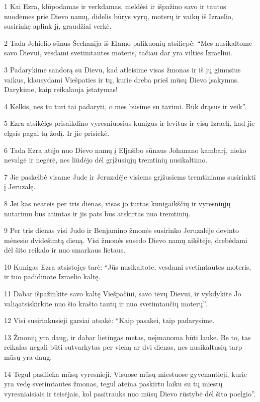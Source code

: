 \par 1 Kai Ezra, klūpodamas ir verkdamas, meldėsi ir išpažino savo ir tautos nuodėmes prie Dievo namų, didelis būrys vyrų, moterų ir vaikų iš Izraelio, susirinkę aplink jį, graudžiai verkė. 
\par 2 Tada Jehielio sūnus Šechanija iš Elamo palikuonių atsiliepė: “Mes nusikaltome savo Dievui, vesdami svetimtautes moteris, tačiau dar yra vilties Izraeliui. 
\par 3 Padarykime sandorą su Dievu, kad atleisime visas žmonas ir iš jų gimusius vaikus, klausydami Viešpaties ir tų, kurie dreba prieš mūsų Dievo įsakymus. Darykime, kaip reikalauja įstatymas! 
\par 4 Kelkis, nes tu turi tai padaryti, o mes būsime su tavimi. Būk drąsus ir veik”. 
\par 5 Ezra atsikėlęs prisaikdino vyresniuosius kunigus ir levitus ir visą Izraelį, kad jie elgsis pagal tą žodį. Ir jie prisiekė. 
\par 6 Tada Ezra atėjo nuo Dievo namų į Eljašibo sūnaus Johanano kambarį, nieko nevalgė ir negėrė, nes liūdėjo dėl grįžusiųjų tremtinių nusikaltimo. 
\par 7 Jie paskelbė visame Jude ir Jeruzalėje visiems grįžusiems tremtiniams susirinkti į Jeruzalę. 
\par 8 Jei kas neateis per tris dienas, visas jo turtas kunigaikščių ir vyresniųjų nutarimu bus atimtas ir jis pats bus atskirtas nuo tremtinių. 
\par 9 Per tris dienas visi Judo ir Benjamino žmonės susirinko Jeruzalėje devinto mėnesio dvidešimtą dieną. Visi žmonės susėdo Dievo namų aikštėje, drebėdami dėl šito reikalo ir nuo smarkaus lietaus. 
\par 10 Kunigas Ezra atsistojęs tarė: “Jūs nusikaltote, vesdami svetimtautes moteris, ir tuo padidinote Izraelio kaltę. 
\par 11 Dabar išpažinkite savo kaltę Viešpačiui, savo tėvų Dievui, ir vykdykite Jo valią­atsiskirkite nuo šio krašto tautų ir nuo svetimtaučių moterų”. 
\par 12 Visi susirinkusieji garsiai atsakė: “Kaip pasakei, taip padarysime. 
\par 13 Žmonių yra daug, ir dabar lietingas metas, neįmanoma būti lauke. Be to, tas reikalas negali būti sutvarkytas per vieną ar dvi dienas, nes nusikaltusių tarp mūsų yra daug. 
\par 14 Tegul pasilieka mūsų vyresnieji. Visuose mūsų miestuose gyvenantieji, kurie yra vedę svetimtautes žmonas, tegul ateina paskirtu laiku su tų miestų vyresniaisiais ir teisėjais, kol pasitrauks nuo mūsų Dievo rūstybė dėl šito poelgio”. 
